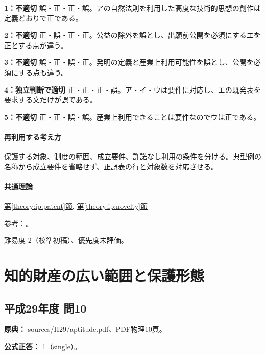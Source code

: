 \noindent\textbf{1：不適切} 誤・正・正・誤。アの自然法則を利用した高度な技術的思想の創作は定義どおりで正である。\par

\noindent\textbf{2：不適切} 正・誤・正・正。公益の除外を誤とし、出願前公開を必須にするエを正とする点が違う。\par

\noindent\textbf{3：不適切} 誤・正・誤・正。発明の定義と産業上利用可能性を誤とし、公開を必須にする点も違う。\par

\noindent\textbf{4：独立判断で適切} 正・正・正・誤。ア・イ・ウは要件に対応し、エの既発表を要求する文だけが誤である。\par

\noindent\textbf{5：不適切} 正・正・誤・誤。産業上利用できることは要件なのでウは正である。\par

\paragraph{再利用する考え方} 保護する対象、制度の範囲、成立要件、許諾なし利用の条件を分ける。典型例の名称から成立要件を省略せず、正誤表の行と対象数を対応させる。

\paragraph{共通理論} \hyperref[theory:ip:patent]{第\ref*{theory:ip:patent}節}, \hyperref[theory:ip:novelty]{第\ref*{theory:ip:novelty}節}

\par 参考：\cite{ip_patent_statute,ip_novelty_grace2018}。

\par 難易度 2（校準初稿）、優先度未評価。

\section{知的財産の広い範囲と保護形態}

\subsection{平成29年度 問10}
\label{q:h29-reg-apt-10}

\noindent\textbf{原典：} sources/H29/aptitude.pdf、PDF物理10頁。

\textbf{公式正答：} 1（single）。

